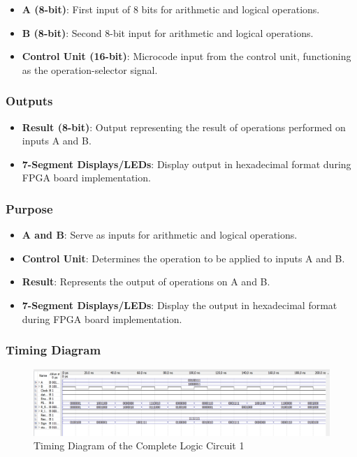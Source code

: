         \begin{itemize}
            \item   {\textbf{A (8-bit)}: First input of 8 bits for arithmetic and logical operations.}
            \item   {\textbf{B (8-bit)}: Second 8-bit input for arithmetic and logical operations.}
            \item   {\textbf{Control Unit (16-bit)}: Microcode input from the control unit, functioning as the operation-selector signal.}
        \end{itemize}

    \subsubsection{{Outputs}}

        \begin{itemize}
            \item   {\textbf{Result (8-bit)}: Output representing the result of operations performed on inputs A and B.}
            \item   {\textbf{7-Segment Displays/LEDs}: Display output in hexadecimal format during FPGA board implementation.}
        \end{itemize}

    \subsubsection{{Purpose}}

        \begin{itemize}
            \item   {\textbf{A and B}: Serve as inputs for arithmetic and logical operations.}
            \item   {\textbf{Control Unit}: Determines the operation to be applied to inputs A and B.}
            \item   {\textbf{Result}: Represents the output of operations on A and B.}
            \item   {\textbf{7-Segment Displays/LEDs}: Display the output in hexadecimal format during FPGA board implementation.}
        \end{itemize}
    
    \subsubsection{{Timing Diagram}}

    \begin{figure}[H]
        \centering
        \includegraphics[width=15cm]{Pictures/ALU1WaveForm.png}
        \caption{{Timing Diagram of the Complete Logic Circuit 1}}
        \label{}
    \end{figure}

